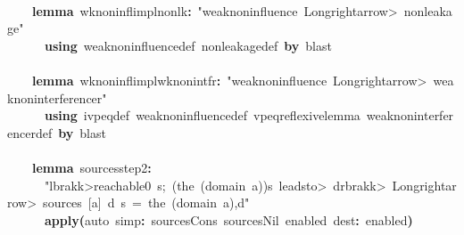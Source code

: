 \documentclass{article}
\newcommand{\syntaxKEYWORDA}[1]{\textcolor[rgb]{0.0,0.4,0.6}{\textbf{#1}}}
\newcommand{\syntaxLITERALA}[1]{\textcolor[rgb]{1.0,0.0,0.8}{#1}}
\newcommand{\syntaxOPERATOR}[1]{\textcolor[rgb]{0.0,0.0,0.0}{\textbf{#1}}}
\newcommand{\syntaxKEYWORDA}[1]{\textcolor[rgb]{0.0,0.4,0.6}{\textbf{#1}}}
\newcommand{\syntaxLITERALA}[1]{\textcolor[rgb]{1.0,0.0,0.8}{#1}}
\newcommand{\syntaxOPERATOR}[1]{\textcolor[rgb]{0.0,0.0,0.0}{\textbf{#1}}}
\newcommand{\syntaxKEYWORDA}[1]{\textcolor[rgb]{0.0,0.4,0.6}{\textbf{#1}}}
\newcommand{\syntaxLITERALA}[1]{\textcolor[rgb]{1.0,0.0,0.8}{#1}}
\newcommand{\syntaxOPERATOR}[1]{\textcolor[rgb]{0.0,0.0,0.0}{\textbf{#1}}}
\newcommand{\syntaxKEYWORDA}[1]{\textcolor[rgb]{0.0,0.4,0.6}{#1}}
\newcommand{\syntaxLITERALA}[1]{\textcolor[rgb]{1.0,0.0,0.8}{\textbf{#1}}}
\newcommand{\syntaxOPERATOR}[1]{\textcolor[rgb]{0.0,0.0,0.0}{#1}}
\newcommand{\syntaxKEYWORDA}[1]{\textcolor[rgb]{0.0,0.4,0.6}{\textbf{#1}}}
\newcommand{\syntaxLITERALA}[1]{\textcolor[rgb]{1.0,0.0,0.8}{#1}}
\newcommand{\syntaxOPERATOR}[1]{\textcolor[rgb]{0.0,0.0,0.0}{\textbf{#1}}}
\newcommand{\syntaxKEYWORDA}[1]{\textcolor[rgb]{0.0,0.4,0.6}{\textbf{#1}}}
\newcommand{\syntaxLITERALA}[1]{\textcolor[rgb]{1.0,0.0,0.8}{#1}}
\newcommand{\syntaxOPERATOR}[1]{\textcolor[rgb]{0.0,0.0,0.0}{\textbf{#1}}}
\begin{document}
\hspace*{\fill}\\
{\ }{\ }{\ }{\ }\syntaxKEYWORDA{lemma}{\ }wk\usebox{\underscorebox}noninfl\usebox{\underscorebox}impl\usebox{\underscorebox}nonlk\syntaxOPERATOR{:}{\ }\syntaxLITERALA{"weak\usebox{\underscorebox}noninfluence{\ }\<Longrightarrow>{\ }nonleakage"}\hspace*{\fill}\\
{\ }{\ }{\ }{\ }{\ }{\ }\syntaxKEYWORDA{using}{\ }weak\usebox{\underscorebox}noninfluence\usebox{\underscorebox}def{\ }nonleakage\usebox{\underscorebox}def{\ }\syntaxKEYWORDA{by}{\ }blast{\ }{\ }{\ }{\ }{\ }{\ }{\ }\hspace*{\fill}\\
{\ }{\ }{\ }{\ }\hspace*{\fill}\\
{\ }{\ }{\ }{\ }\syntaxKEYWORDA{lemma}{\ }wk\usebox{\underscorebox}noninfl\usebox{\underscorebox}impl\usebox{\underscorebox}wk\usebox{\underscorebox}nonintf\usebox{\underscorebox}r\syntaxOPERATOR{:}{\ }\syntaxLITERALA{"weak\usebox{\underscorebox}noninfluence{\ }\<Longrightarrow>{\ }weak\usebox{\underscorebox}noninterference\usebox{\underscorebox}r"}\hspace*{\fill}\\
{\ }{\ }{\ }{\ }{\ }{\ }\syntaxKEYWORDA{using}{\ }ivpeq\usebox{\underscorebox}def{\ }weak\usebox{\underscorebox}noninfluence\usebox{\underscorebox}def{\ }vpeq\usebox{\underscorebox}reflexive\usebox{\underscorebox}lemma{\ }weak\usebox{\underscorebox}noninterference\usebox{\underscorebox}r\usebox{\underscorebox}def{\ }\syntaxKEYWORDA{by}{\ }blast{\ }\hspace*{\fill}\\
{\ }{\ }\hspace*{\fill}\\
{\ }{\ }{\ }{\ }\syntaxKEYWORDA{lemma}{\ }sources\usebox{\underscorebox}step2\syntaxOPERATOR{:}\hspace*{\fill}\\
{\ }{\ }{\ }{\ }{\ }{\ }\syntaxLITERALA{"\<lbrakk>reachable0{\ }s;{\ }(the{\ }(domain{\ }a))\usebox{\atbox}s{\ }\<leadsto>{\ }d\<rbrakk>{\ }\<Longrightarrow>{\ }sources{\ }{[}a{]}{\ }d{\ }s{\ }={\ }\usebox{\opencurlybracket}the{\ }(domain{\ }a),d\usebox{\closecurlybracket}"}\hspace*{\fill}\\
{\ }{\ }{\ }{\ }{\ }{\ }\syntaxKEYWORDA{apply}\syntaxOPERATOR{(}auto{\ }simp\syntaxOPERATOR{:}{\ }sources\usebox{\underscorebox}Cons{\ }sources\usebox{\underscorebox}Nil{\ }enabled{\ }dest\syntaxOPERATOR{:}{\ }enabled\syntaxOPERATOR{)}\hspace*{\fill}\\
\end{document}
